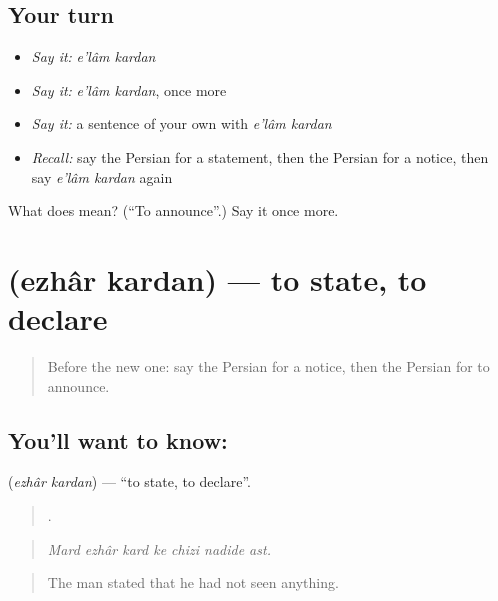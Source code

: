\subsection*{Your turn}
\begin{itemize}
\raggedright
  \item \emph{Say it:} \emph{e'lâm kardan}
  \item \emph{Say it:} \emph{e'lâm kardan}, once more
  \item \emph{Say it:} a sentence of your own with \emph{e'lâm kardan}
  \item \emph{Recall:} say the Persian for a statement, then the Persian for a notice, then say \emph{e'lâm kardan} again
\end{itemize}

\begin{tcolorbox}[breakable,colback=teal!4,colframe=teal!35!black,title={Before you move on}]
What does   mean? (\textquotedblleft{}To announce\textquotedblright{}.) Say it once more.
\end{tcolorbox}
\section[\texorpdfstring{\fa{اظهار} \fa{کردن} (ezhâr kardan)}{اظهار کردن (ezhâr kardan)}]{  (ezhâr kardan) — to state, to declare}

\label{lesson:FA-C309-ezhar-kardan}



\begin{quote}
Before the new one: say the Persian for a notice, then the Persian for to announce.
\end{quote}

\subsection*{You'll want to know:  }
\textbf{ } (\emph{ezhâr kardan}) — \textquotedblleft{}to state, to declare\textquotedblright{}.

\begin{quote}
      .
\end{quote}

\begin{quote}
\emph{Mard ezhâr kard ke chizi nadide ast.}
\end{quote}

\begin{quote}
The man stated that he had not seen anything.
\end{quote}

